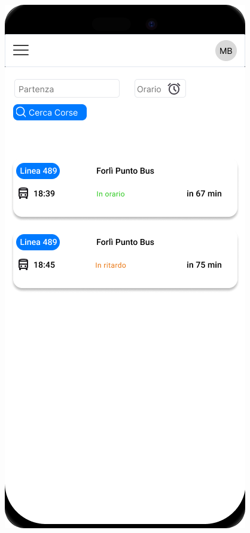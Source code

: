 \begin{figure}[H]
  \centering
  \begin{minipage}[b]{0.45\textwidth}
    \centering
    \includegraphics[width=\textwidth]{images/mockup/Ricerca Linee.png}

\end{minipage}
\end{figure}

